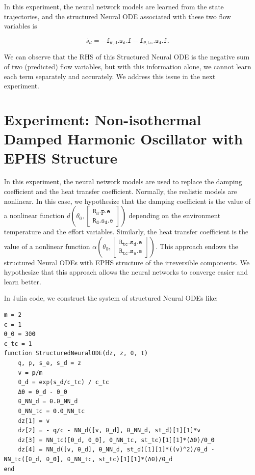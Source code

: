 \documentclass[
	parskip, 			   %
	twoside, 			   %
	DIV=14, 			   %
	BCOR=15.0mm, 		   %
	headsepline, 		   %
	open=right, 		   %
	captions=tableheading, %
	bibliography=totoc,    %
	numbers=noenddot       %
]{scrreprt}
\begin{document}
In this experiment, the neural network models are learned from the state trajectories, and the structured Neural ODE associated with these two flow variables is

\begin{equation}
    \label{eq:NeuralODE_ndho_EPHS_last_line}
    \dot{s_d} = -\mathtt{f_{\theta, d}.s_{d}.f}-\mathtt{f_{\theta, tc}.s_{d}.f}.
\end{equation}

We can observe that the RHS of this Structured Neural ODE is the negative sum of two (predicted) flow variables, but with this information alone, we cannot learn each term separately and accurately. We address this issue in the next experiment.

\clearpage
\section{Experiment: Non-isothermal Damped Harmonic Oscillator with EPHS Structure}
In this experiment, the neural network models are used to replace the damping coefficient and the heat transfer coefficient. Normally, the realistic models are nonlinear. In this case, we hypothesize that the damping coefficient is the value of a nonlinear function $d \left( \theta_0, \left[\begin{array}{l}\mathtt{R_{d}.p.e} \\ \mathtt{R_{d}.s_{d}.e}\end{array}\right] \right)$ depending on the environment temperature and the effort variables. Similarly, the heat transfer coefficient is the value of a nonlinear function $\alpha \left( \theta_0, \left[\begin{array}{l} \mathtt{R_{tc}.s_{d}.e} \\ \mathtt{R_{tc}.s_{e}.e}\end{array}\right] \right)$. This approach endows the structured Neural ODEs with EPHS structure of the irreversible components. We hypothesize that this approach allows the neural networks to converge easier and learn better.

In Julia code, we construct the system of structured Neural ODEs like:

\begin{verbatim}
m = 2
c = 1
θ_0 = 300
c_tc = 1
function StructuredNeuralODE(dz, z, θ, t)
    q, p, s_e, s_d = z
    v = p/m
    θ_d = exp(s_d/c_tc) / c_tc
    Δθ = θ_d - θ_0
    θ_NN_d = θ.θ_NN_d
    θ_NN_tc = θ.θ_NN_tc   
    dz[1] = v
    dz[2] = - q/c - NN_d([v, θ_d], θ_NN_d, st_d)[1][1]*v
    dz[3] = NN_tc([θ_d, θ_0], θ_NN_tc, st_tc)[1][1]*(Δθ)/θ_0
    dz[4] = NN_d([v, θ_d], θ_NN_d, st_d)[1][1]*((v)^2)/θ_d - NN_tc([θ_d, θ_0], θ_NN_tc, st_tc)[1][1]*(Δθ)/θ_d
end
\end{verbatim}
\end{document}
